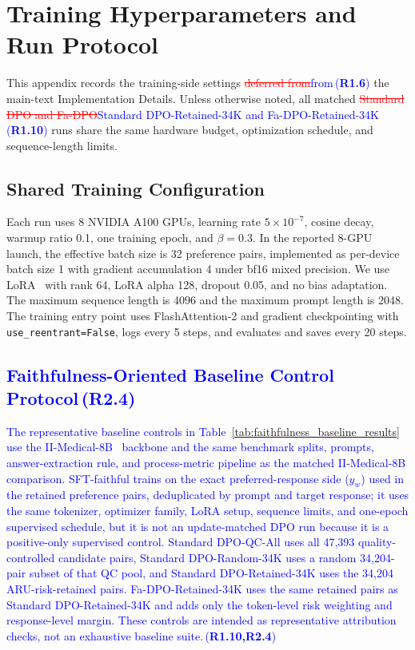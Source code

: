 \documentclass[a4paper,fleqn,doubleblind]{cas-sc}
\DeclareRobustCommand{\deleted}[1]{\textcolor{red}{\sout{#1}}}
\DeclareRobustCommand{\added}[1]{\textcolor{blue}{#1}}
\DeclareRobustCommand{\revtag}[1]{\textcolor{blue}{\scriptsize\,(\textbf{#1})}}
\begin{document}
\section{Training Hyperparameters and Run Protocol}
\label{app:training_details}

This appendix records the training-side settings \deleted{deferred from}\added{from}\revtag{R1.6} the main-text Implementation Details. Unless otherwise noted, all matched \deleted{Standard DPO and Fa-DPO}\added{Standard DPO-Retained-34K and Fa-DPO-Retained-34K}\revtag{R1.10} runs share the same hardware budget, optimization schedule, and sequence-length limits.

\subsection{Shared Training Configuration}

Each run uses 8 NVIDIA A100 GPUs, learning rate $5\times10^{-7}$, cosine decay, warmup ratio 0.1, one training epoch, and $\beta=0.3$. In the reported 8-GPU launch, the effective batch size is 32 preference pairs, implemented as per-device batch size 1 with gradient accumulation 4 under bf16 mixed precision. We use LoRA~\cite{hu2022lora} with rank 64, LoRA alpha 128, dropout 0.05, and no bias adaptation. The maximum sequence length is 4096 and the maximum prompt length is 2048. The training entry point uses FlashAttention-2 and gradient checkpointing with \texttt{use\_reentrant=False}, logs every 5 steps, and evaluates and saves every 20 steps.

\subsection{\added{Faithfulness-Oriented Baseline Control Protocol}\revtag{R2.4}}
\label{app:faithfulness_baseline_protocol}

\added{The representative baseline controls in Table~\ref{tab:faithfulness_baseline_results} use the II-Medical-8B~\cite{intelligentinternet2025iimedical8b} backbone and the same benchmark splits, prompts, answer-extraction rule, and process-metric pipeline as the matched II-Medical-8B comparison. SFT-faithful trains on the exact preferred-response side ($y_w$) used in the retained preference pairs, deduplicated by prompt and target response; it uses the same tokenizer, optimizer family, LoRA setup, sequence limits, and one-epoch supervised schedule, but it is not an update-matched DPO run because it is a positive-only supervised control. Standard DPO-QC-All uses all 47,393 quality-controlled candidate pairs, Standard DPO-Random-34K uses a random 34,204-pair subset of that QC pool, and Standard DPO-Retained-34K uses the 34,204 ARU-risk-retained pairs. Fa-DPO-Retained-34K uses the same retained pairs as Standard DPO-Retained-34K and adds only the token-level risk weighting and response-level margin. These controls are intended as representative attribution checks, not an exhaustive baseline suite.}\revtag{R1.10,R2.4}
\end{document}
